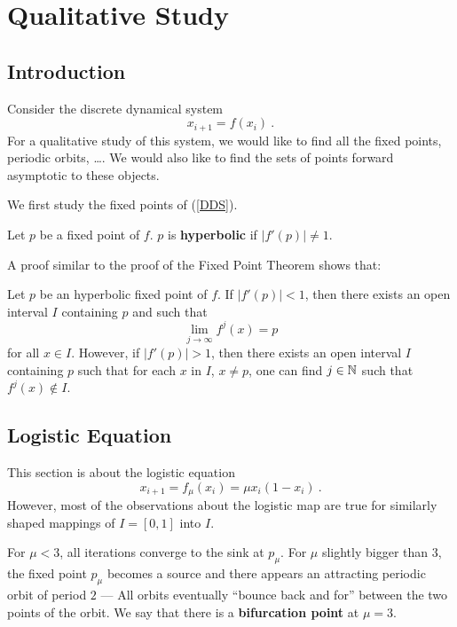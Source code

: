 \chapter{Qualitative Study}

\section{Introduction}

Consider the discrete dynamical system
\begin{equation} \label{DDS}
x_{i+1} = f(x_i) \ .
\end{equation}
For a qualitative study of this system, we would like to find all the
fixed points, periodic orbits, \ldots.  We would also like to find the
sets of points forward asymptotic to these objects.

We first study the fixed points of (\ref{DDS}).

\begin{defn}
Let $p$ be a fixed point of $f$.  $p$ is {\bfseries
hyperbolic} if
$\left|f'(p)\right| \neq 1$.
\end{defn}

A proof similar to the proof of the Fixed Point Theorem shows that:

\begin{prop} \label{fp_stability}
Let $p$ be an hyperbolic fixed point of $f$.  If
$\left|f'(p)\right|<1$, then there exists an open interval $I$
containing $p$ and such that
\[
\lim_{j\rightarrow \infty} f^j(x) = p
\]
for all $x \in I$.
However, if $\left|f'(p)\right|>1$, then there exists an open
interval $I$ containing $p$ such that for each $x$ in $I$,
$x \neq p$, one can find $j \in \mathbb{N}$ such that $f^j(x) \not\in I$.
\end{prop}

\section{Logistic Equation}

This section is about the logistic equation
\[
x_{i+1} = f_\mu(x_i) = \mu x_i (1-x_i) \ .
\]
However, most of the observations about the logistic map are true for
similarly shaped mappings of $I=[0,1]$ into $I$.

For $\mu<3$, all iterations converge to the sink at $p_\mu$.   For
$\mu$ slightly bigger than $3$, the fixed point $p_\mu$ becomes a
source and there appears an attracting  periodic orbit of period $2$
--- All orbits eventually ``bounce back and for'' between the two
points of the orbit.    We say that there is a
{\bfseries bifurcation point} at $\mu=3$.

